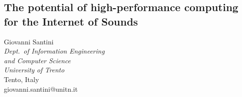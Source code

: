 \documentclass[12pt]{article}
\begin{document}
\fontsize{9}{10}\selectfont  %

\begin{center}
\section*{\huge{\sffamily The potential of high-performance computing
for the Internet of Sounds}}
Giovanni Santini \\
\textit{Dept.\ of Information Engineering \\
and Computer Science} \\
\textit{University of Trento} \\
Tento, Italy \\
giovanni.santini@unitn.it
\end{center}

\bigskip
\end{document}
